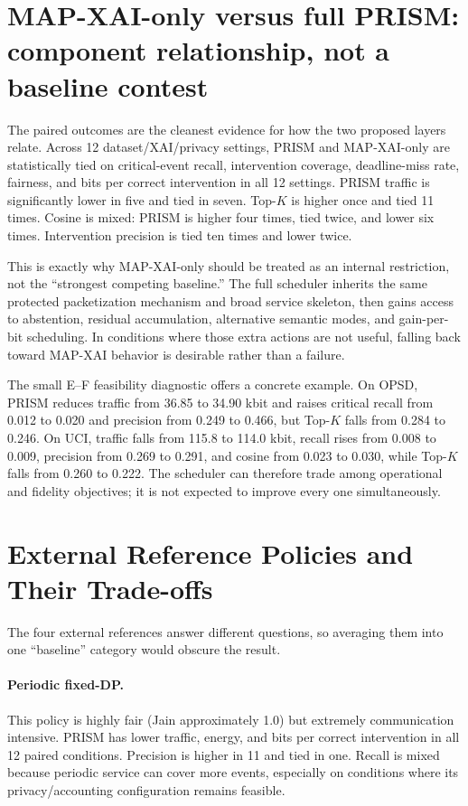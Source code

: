\documentclass[11pt]{article}
\newcommand{\MAP}{MAP-XAI}
\begin{document}
\section{MAP-XAI-only versus full PRISM: component relationship, not a baseline contest}
The paired outcomes are the cleanest evidence for how the two proposed layers relate. Across 12 dataset/XAI/privacy settings, PRISM and \MAP{}-only are statistically tied on critical-event recall, intervention coverage, deadline-miss rate, fairness, and bits per correct intervention in all 12 settings. PRISM traffic is significantly lower in five and tied in seven. Top-$K$ is higher once and tied 11 times. Cosine is mixed: PRISM is higher four times, tied twice, and lower six times. Intervention precision is tied ten times and lower twice.

This is exactly why \MAP{}-only should be treated as an internal restriction, not the ``strongest competing baseline.'' The full scheduler inherits the same protected packetization mechanism and broad service skeleton, then gains access to abstention, residual accumulation, alternative semantic modes, and gain-per-bit scheduling. In conditions where those extra actions are not useful, falling back toward \MAP{} behavior is desirable rather than a failure.

The small E--F feasibility diagnostic offers a concrete example. On OPSD, PRISM reduces traffic from 36.85 to 34.90 kbit and raises critical recall from 0.012 to 0.020 and precision from 0.249 to 0.466, but Top-$K$ falls from 0.284 to 0.246. On UCI, traffic falls from 115.8 to 114.0 kbit, recall rises from 0.008 to 0.009, precision from 0.269 to 0.291, and cosine from 0.023 to 0.030, while Top-$K$ falls from 0.260 to 0.222. The scheduler can therefore trade among operational and fidelity objectives; it is not expected to improve every one simultaneously.




\section{External Reference Policies and Their Trade-offs}
The four external references answer different questions, so averaging them into one ``baseline'' category would obscure the result.

\paragraph{Periodic fixed-DP.} This policy is highly fair (Jain approximately 1.0) but extremely communication intensive. PRISM has lower traffic, energy, and bits per correct intervention in all 12 paired conditions. Precision is higher in 11 and tied in one. Recall is mixed because periodic service can cover more events, especially on conditions where its privacy/accounting configuration remains feasible.
\end{document}
